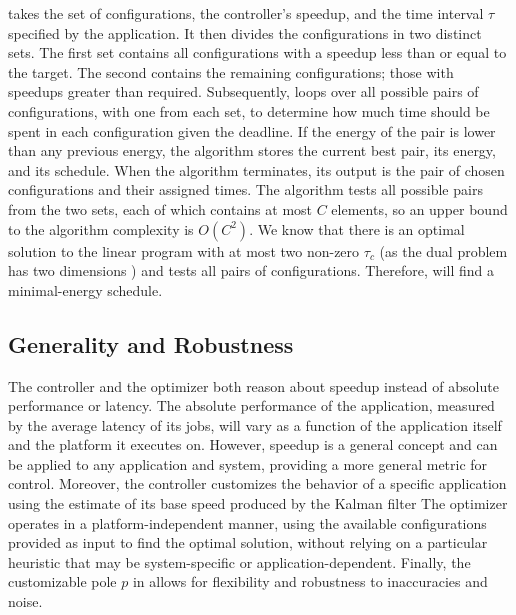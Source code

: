  takes the set of configurations, the controller's speedup, and the time interval $\tau$ specified by the application.
It then divides the configurations in two distinct sets.
The first set contains all configurations with a speedup less than or equal to the target.
The second contains the remaining configurations; \ie those with speedups greater than required.
Subsequently,  loops over all possible pairs of configurations, with one from each set, to determine how much time should be spent in each configuration given the deadline.
If the energy of the pair is lower than any previous energy, the algorithm stores the current best pair, its energy, and its schedule.
When the algorithm terminates, its output is the pair of chosen configurations and their assigned times.
The algorithm tests all possible pairs from the two sets, each of which contains at most $C$ elements, so an upper bound to the algorithm complexity is $O(C^2)$.
We know that there is an optimal solution to the linear program with at most two non-zero $\tau_c$ (as the dual problem has two dimensions \cite{LP}) and  tests all pairs of configurations.
Therefore,  will find a minimal-energy schedule.


\subsection{Generality and Robustness}

The controller and the optimizer both reason about speedup instead of absolute performance or latency.
The absolute performance of the application, measured by the average latency of its jobs, will vary as a function of the application itself and the platform it executes on.
However, speedup is a general concept and can be applied to any application and system, providing a more general metric for control.
Moreover, the controller customizes the behavior of a specific application using the estimate of its base speed produced by the Kalman filter
The optimizer operates in a platform-independent manner, using the available configurations provided as input to find the optimal solution, without relying on a particular heuristic that may be system-specific or application-dependent.
Finally, the customizable pole $p$ in  allows for flexibility and robustness to inaccuracies and noise.


